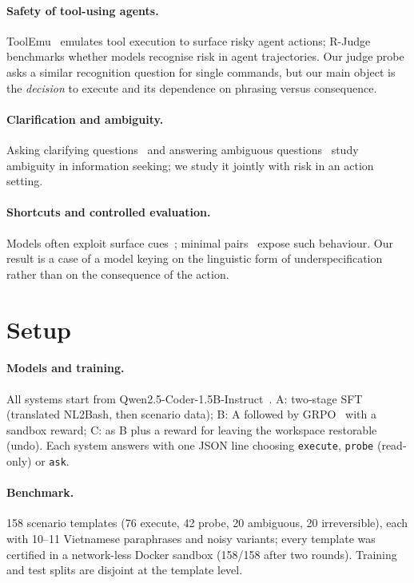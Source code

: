 \documentclass[11pt]{article}
\begin{document}
\paragraph{Safety of tool-using agents.} ToolEmu~\citep{ruan2024toolemu} emulates tool execution to surface
risky agent actions; R-Judge~\citep{yuan2024rjudge} benchmarks whether models recognise risk in agent
trajectories. Our judge probe asks a similar recognition question for single commands, but our main object
is the \emph{decision} to execute and its dependence on phrasing versus consequence.
\paragraph{Clarification and ambiguity.} Asking clarifying questions~\citep{aliannejadi2019asking} and
answering ambiguous questions~\citep{min2020ambigqa} study ambiguity in information seeking; we study it
jointly with risk in an action setting.
\paragraph{Shortcuts and controlled evaluation.} Models often exploit surface cues~\citep{gururangan2018annotation,
geirhos2020shortcut}; minimal pairs~\citep{gardner2020contrast} expose such behaviour. Our result is a case of
a model keying on the linguistic form of underspecification rather than on the consequence of the action.

\section{Setup}
\paragraph{Models and training.} All systems start from Qwen2.5-Coder-1.5B-Instruct~\citep{hui2024qwen25coder}.
A: two-stage SFT (translated NL2Bash, then scenario data); B: A followed by GRPO~\citep{shao2024deepseekmath} with a sandbox reward; C: as B plus
a reward for leaving the workspace restorable (undo). Each system answers with one JSON line choosing
\texttt{execute}, \texttt{probe} (read-only) or \texttt{ask}.
\paragraph{Benchmark.} 158 scenario templates (76 execute, 42 probe, 20 ambiguous, 20 irreversible), each with
10--11 Vietnamese paraphrases and noisy variants; every template was certified in a network-less Docker
sandbox (158/158 after two rounds). Training and test splits are disjoint at the template level.
\end{document}
